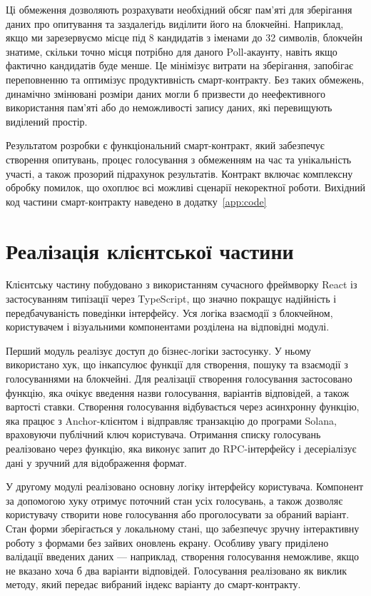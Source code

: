 \documentclass[14pt]{extreport}
\begin{document}
  Ці обмеження дозволяють розрахувати необхідний обсяг пам'яті для зберігання даних про опитування та заздалегідь виділити його на блокчейні. Наприклад, якщо ми зарезервуємо місце під 8 кандидатів з іменами до 32 символів, блокчейн знатиме, скільки точно місця потрібно для даного Poll-акаунту, навіть якщо фактично кандидатів буде менше. Це мінімізує витрати на зберігання, запобігає переповненню та оптимізує продуктивність смарт-контракту. Без таких обмежень, динамічно змінювані розміри даних могли б призвести до неефективного використання пам'яті або до неможливості запису даних, які перевищують виділений простір.

  Результатом розробки є функціональний смарт-контракт, який забезпечує створення опитувань, процес голосування з обмеженням на час та унікальність участі, а також прозорий підрахунок результатів. Контракт включає комплексну обробку помилок, що охоплює всі можливі сценарії некоректної роботи. Вихідний код частини смарт-контракту наведено в додатку~\ref{app:code}
  
  \section{Реалізація клієнтської частини}
  
  Клієнтську частину побудовано з використанням сучасного фреймворку React із застосуванням типізації через TypeScript, що значно покращує надійність і передбачуваність поведінки інтерфейсу. Уся логіка взаємодії з блокчейном, користувачем і візуальними компонентами розділена на відповідні модулі.

  Перший модуль реалізує доступ до бізнес-логіки застосунку. У ньому використано хук, що інкапсулює функції для створення, пошуку та взаємодії з голосуваннями на блокчейні. Для реалізації створення голосування застосовано функцію, яка очікує введення назви голосування, варіантів відповідей, а також вартості ставки. Створення голосування відбувається через асинхронну функцію, яка працює з Anchor-клієнтом і відправляє транзакцію до програми Solana, враховуючи публічний ключ користувача. Отримання списку голосувань реалізовано через функцію, яка виконує запит до RPC-інтерфейсу і десеріалізує дані у зручний для відображення формат.

  У другому модулі реалізовано основну логіку інтерфейсу користувача. Компонент за допомогою хуку отримує поточний стан усіх голосувань, а також дозволяє користувачу створити нове голосування або проголосувати за обраний варіант. Стан форми зберігається у локальному стані, що забезпечує зручну інтерактивну роботу з формами без зайвих оновлень екрану. Особливу увагу приділено валідації введених даних — наприклад, створення голосування неможливе, якщо не вказано хоча б два варіанти відповідей. Голосування реалізовано як виклик методу, який передає вибраний індекс варіанту до смарт-контракту.
\end{document}
